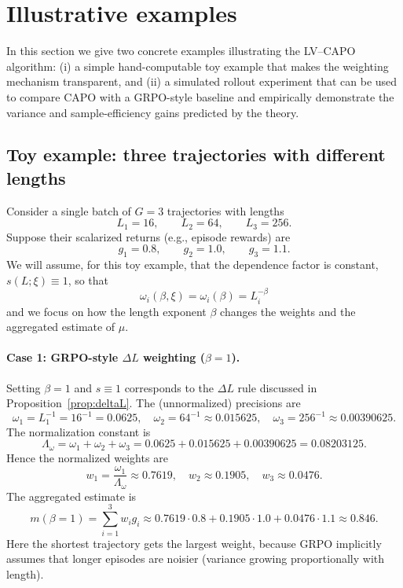 \section{Illustrative examples}
\label{sec:eb-examples}

In this section we give two concrete examples illustrating the LV--CAPO algorithm:
(i) a simple hand-computable toy example that makes the weighting mechanism transparent, and
(ii) a simulated rollout experiment that can be used to compare CAPO with a GRPO-style baseline and empirically demonstrate the variance and sample-efficiency gains predicted by the theory.

\subsection{Toy example: three trajectories with different lengths}
\label{sec:toy-example-eb}

Consider a single batch of \(G=3\) trajectories with lengths
\[
L_1=16,\qquad L_2=64,\qquad L_3=256.
\]
Suppose their scalarized returns (e.g., episode rewards) are
\[
g_1=0.8,\qquad g_2=1.0,\qquad g_3=1.1.
\]
We will assume, for this toy example, that the dependence factor is constant, \(s(L;\xi)\equiv 1\), so that
\[
\omega_i(\beta,\xi)=\omega_i(\beta)=L_i^{-\beta}
\]
and we focus on how the length exponent \(\beta\) changes the weights and the aggregated estimate of \(\mu\).

\paragraph{Case 1: GRPO-style \(\Delta L\) weighting (\(\beta=1\)).}
Setting \(\beta=1\) and \(s\equiv 1\) corresponds to the \(\Delta L\) rule discussed in Proposition~\ref{prop:deltaL}.
The (unnormalized) precisions are
\[
\omega_1=L_1^{-1}=16^{-1}=0.0625,\quad
\omega_2=64^{-1}\approx 0.015625,\quad
\omega_3=256^{-1}\approx 0.00390625.
\]
The normalization constant is
\[
\Lambda_\omega=\omega_1+\omega_2+\omega_3
=0.0625+0.015625+0.00390625
=0.08203125.
\]
Hence the normalized weights are
\[
w_1=\frac{\omega_1}{\Lambda_\omega}\approx 0.7619,\quad
w_2\approx 0.1905,\quad
w_3\approx 0.0476.
\]
The aggregated estimate is
\[
m(\beta=1)
=\sum_{i=1}^3 w_i g_i
\approx 0.7619\cdot 0.8 + 0.1905\cdot 1.0 + 0.0476\cdot 1.1
\approx 0.846.
\]
Here the shortest trajectory gets the largest weight, because GRPO implicitly assumes that longer episodes are noisier (variance growing proportionally with length).

